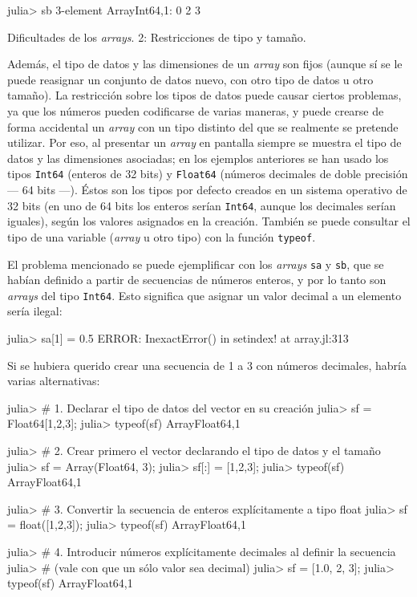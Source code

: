 ﻿\documentclass{article}
\newcommand{\code}{\texttt}
\begin{document}
julia> sb
3-element Array{Int64,1}:
 0
 2
 3


Dificultades de los \emph{arrays}. 2: Restricciones de tipo y tamaño.

Además, el tipo de datos y las dimensiones de un \emph{array} son fijos (aunque sí se le puede reasignar un conjunto de datos nuevo, con otro tipo de datos u otro tamaño). La restricción sobre los tipos de datos puede causar ciertos problemas, ya que los números pueden codificarse de varias maneras, y puede crearse de forma accidental un \emph{array} con un tipo distinto del que se realmente se pretende utilizar. Por eso, al presentar un \emph{array} en pantalla siempre se muestra el tipo de datos y las dimensiones asociadas; en los ejemplos anteriores se han usado los tipos \code{Int64} (enteros de 32 bits) y \code{Float64} (números decimales de doble precisión --- 64 bits ---). Éstos son los tipos por defecto creados en un sistema operativo de 32 bits (en uno de 64 bits los enteros serían \code{Int64}, aunque los decimales serían iguales), según los valores asignados en la creación. También se puede consultar el tipo de una variable (\emph{array} u otro tipo) con la función \code{typeof}.

El problema mencionado se puede ejemplificar con los \emph{arrays} \code{sa} y \code{sb}, que se habían definido a partir de secuencias de números enteros, y por lo tanto son \emph{arrays} del tipo \code{Int64}. Esto significa que asignar un valor decimal a un elemento sería ilegal:

julia> sa[1] = 0.5
ERROR: InexactError()
 in setindex! at array.jl:313

Si se hubiera querido crear una secuencia de 1 a 3 con números decimales, habría varias alternativas:

julia> # 1. Declarar el tipo de datos del vector en su creación
julia> sf = Float64[1,2,3];
julia> typeof(sf)
Array{Float64,1}

julia> # 2. Crear primero el vector declarando el tipo de datos y el tamaño
julia> sf = Array(Float64, 3);
julia> sf[:] = [1,2,3];
julia> typeof(sf)
Array{Float64,1}

julia> # 3. Convertir la secuencia de enteros explícitamente a tipo float
julia> sf = float([1,2,3]);
julia> typeof(sf)
Array{Float64,1}

julia> # 4. Introducir números explícitamente decimales al definir la secuencia
julia> # (vale con que un sólo valor sea decimal)
julia> sf = [1.0, 2, 3];
julia> typeof(sf)
Array{Float64,1}
\end{document}

